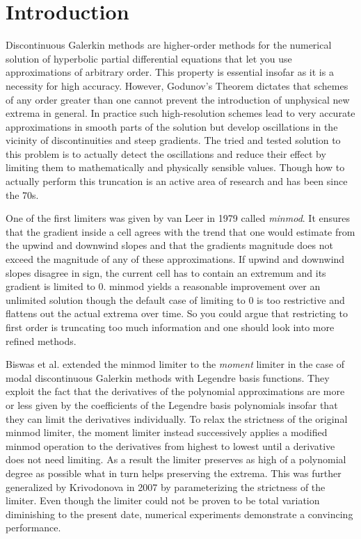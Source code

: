 \section{Introduction}

Discontinuous Galerkin methods are higher-order methods for the numerical solution of hyperbolic partial differential equations that let you use approximations of arbitrary order.
This property is essential insofar as it is a necessity for high accuracy.
However, Godunov's Theorem dictates that schemes of any order greater than one cannot prevent the introduction of unphysical new extrema in general.
In practice such high-resolution schemes lead to very accurate approximations in smooth parts of the solution but develop oscillations in the vicinity of discontinuities and steep gradients.
The tried and tested solution to this problem is to actually detect the oscillations and reduce their effect by limiting them to mathematically and physically sensible values.
Though how to actually perform this truncation is an active area of research and has been since the 70s.

One of the first limiters was given by van Leer in 1979 called \emph{minmod}\cite{VanLeer1979}.
It ensures that the gradient inside a cell agrees with the trend that one would estimate from the upwind and downwind slopes and that the gradients magnitude does not exceed the magnitude of any of these approximations.
If upwind and downwind slopes disagree in sign, the current cell has to contain an extremum and its gradient is limited to $0$.
minmod yields a reasonable improvement over an unlimited solution though the default case of limiting to $0$ is too restrictive and flattens out the actual extrema over time.
So you could argue that restricting to first order is truncating too much information and one should look into more refined methods.

Biswas et al. extended the minmod limiter to the \emph{moment} limiter\cite{Biswas1994} in the case of modal discontinuous Galerkin methods with Legendre basis functions.
They exploit the fact that the derivatives of the polynomial approximations are more or less given by the coefficients of the Legendre basis polynomials insofar that they can limit the derivatives individually.
To relax the strictness of the original minmod limiter, the moment limiter instead successively applies a modified minmod operation to the derivatives from highest to lowest until a derivative does not need limiting.
As a result the limiter preserves as high of a polynomial degree as possible what in turn helps preserving the extrema.
This was further generalized by Krivodonova in 2007 by parameterizing the strictness of the limiter\cite{Krivodonova}.
Even though the limiter could not be proven to be total variation diminishing to the present date, numerical experiments demonstrate a convincing performance.

